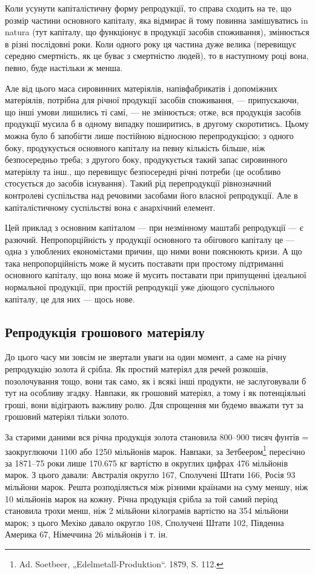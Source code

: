 Коли усунути капіталістичну форму репродукції, то справа сходить
на те, що розмір частини основного капіталу, яка відмирає й тому
повинна замішуватись in natura (тут капіталу, що функціонує в продукції
засобів споживання), змінюється в різні послідовні роки. Коли одного
року ця частина дуже велика (перевищує середню смертність, як це
буває з смертністю людей), то в наступному році вона, певно, буде
настільки ж менша.

Але від цього маса сировинних матеріялів, напівфабрикатів і допоміжних
матеріялів, потрібна для річної продукції засобів споживання, — припускаючи,
що інші умови лишились ті самі, — не змінюється; отже, вся
продукція засобів продукції мусила б в одному випадку поширитись, в
другому скоротитись. Цьому можна було б запобігти лише постійною
відносною перепродукцією; з одного боку, продукується основного
капіталу на певну кількість більше, ніж безпосередньо треба; з другого
боку, продукується такий запас сировинного матеріялу та інш., що
перевищує безпосередні річні потреби (це особливо стосується до засобів
існування). Такий рід перепродукції рівнозначний контролеві суспільства
над речовими засобами його власної репродукції. Але в капіталістичному
суспільстві вона є анархічний елемент.

Цей приклад з основним капіталом — при незмінному маштабі репродукції
— є разючий. Непропорційність у продукції основного та обігового
капіталу це — одна з улюблених економістами причин, що ними вони
пояснюють кризи. А що така непропорційність може й мусить поставати
при простому підтриманні основного капіталу, що вона може й
мусить поставати при припущенні ідеальної нормальної продукції, при
простій репродукції уже діющого суспільного капіталу, це для них — щось
нове.

\subsection{Репродукція грошового матеріялу}

До цього часу ми зовсім не звертали уваги на один момент, а саме
на річну репродукцію золота й срібла. Як простий матеріял для речей
розкошів, позолочування тощо, вони так само, як і всякі інші продукти,
не заслуговували б тут на особливу згадку. Навпаки, як грошовий
матеріял, а тому і як потенціяльні гроші, вони відіграють важливу ролю.
Для спрощення ми будемо вважати тут за грошовий матеріял тільки золото.

За старими даними вся річна продукція золота становила 800--900
тисяч фунтів = заокруглюючи 1100 або 1250 мільйонів марок. Навпаки,
за Зетбеером\footnote{Ad. Soetbeer, „Edelmetall-Produktion“. 1879, S. 112.} пересічно за 1871--75 роки лише 170.675 кг вартістю
в округлих цифрах 476 мільйонів марок. З цього давали: Австралія
округло 167, Сполучені Штати 166, Росія 93 мільйони марок. Решта
розподіляється між різними країнами на суму меншу, ніж 10 мільйонів
марок на кожну. Річна продукція срібла за той самий період становила
трохи менш, ніж 2 мільйони кілограмів вартістю на 354 мільйони
марок; з цього Мехіко давало округло 108, Сполучені Штати 102,
Південна Америка 67, Німеччина 26 мільйонів і т. ін.


